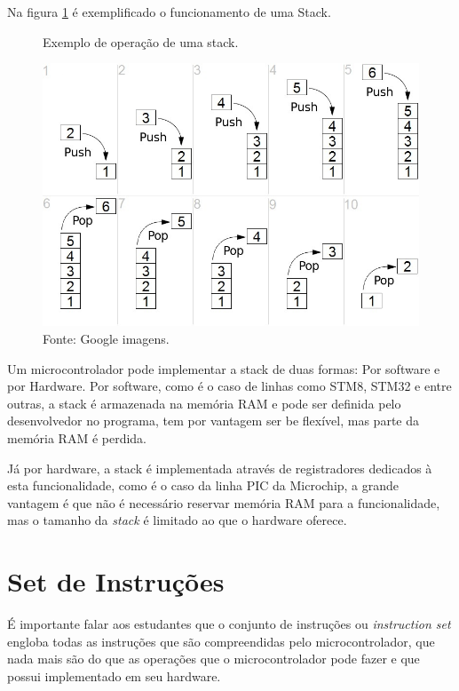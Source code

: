 \documentclass[12pt,a4paper]{report}
\begin{document}
Na figura \ref{fig:stack_pointer} é exemplificado o funcionamento de uma Stack.

\begin{figure}[H]      %
    \begin{center}		   %
    \caption{Exemplo de operação de uma stack.}		%
    \includegraphics[scale=0.6]{fig/stack_pointer.jpg}
    \caption*{Fonte: Google imagens.}
    \label{fig:stack_pointer}
    \end{center}
\end{figure}

Um microcontrolador pode implementar a stack de duas formas: Por software e por Hardware. Por software, como é o caso de linhas como STM8, STM32 e entre outras, a stack é armazenada na memória RAM e pode ser definida pelo desenvolvedor no programa, tem por vantagem ser be flexível, mas parte da memória RAM é perdida.

Já por hardware, a stack é implementada através de registradores dedicados à esta funcionalidade, como é o caso da linha PIC da Microchip, a grande vantagem é que não é necessário reservar memória RAM para a funcionalidade, mas o tamanho da \textit{stack} é limitado ao que o hardware oferece.

\section{Set de Instruções}

É importante falar aos estudantes que o conjunto de instruções ou \textit{instruction set} engloba todas as instruções que são compreendidas pelo microcontrolador, que nada mais são do que as operações que o microcontrolador pode fazer e que possui implementado em seu hardware.
\end{document}
